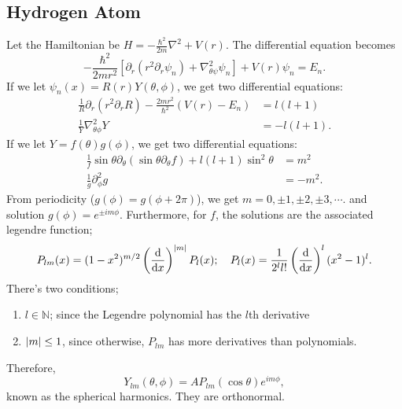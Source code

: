 \documentclass{article}
\begin{document}
\subsection{Hydrogen Atom}
Let the Hamiltonian be $H=-\frac{\hbar^2}{2m}\nabla^2+V(r)$. The differential equation becomes
$$-\frac{\hbar^2}{2mr^2}\left[\partial_r(r^2\partial_r\psi_n)+\nabla_{\theta\psi}^2\psi_n\right]+V(r)\psi_n=E_n.$$
If we let $\psi_n(x)=R(r)Y(\theta,\phi)$, we get two differential equations:
\begin{align*}
    \frac 1R\partial_r(r^2\partial_r R)-\frac{2mr^2}{\hbar^2}(V(r)-E_n)&=l(l+1)\\
    \frac 1Y\nabla^2_{\theta\phi}Y&=-l(l+1).
\end{align*}
If we let $Y=f(\theta)g(\phi)$, we get two differential equations:
\begin{align*}
    \frac 1f\sin\theta\partial_\theta(\sin\theta\partial_\theta f)+l(l+1)\sin^2\theta&=m^2\\
    \frac 1g\partial_\phi^2g&=-m^2.
\end{align*}
From periodicity ($g(\phi)=g(\phi+2\pi)$), we get $m=0,\pm 1,\pm 2,\pm 3,\cdots.$ and solution $g(\phi)=e^{\pm im\phi}$. Furthermore, for $f$, the solutions are the associated legendre function; 
$$P_{lm}(x)=(1-x^2)^{m/2}\left(\frac{\mathrm{d}}{\mathrm{d}x}\right)^{\left\lvert m\right\rvert}P_l(x);\quad P_l(x)=\frac 1{2^ll!}\left(\frac{\mathrm{d}}{\mathrm{d}x}\right)^l(x^2-1)^l.$$
There's two conditions; 
\begin{enumerate}
    \item $l\in\mathbb N$; since the Legendre polynomial has the $l$th derivative
    \item $\left\lvert m\right\rvert\le 1$, since otherwise, $P_{lm}$ has more derivatives than polynomials.
\end{enumerate}
Therefore, 
$$Y_{lm}(\theta,\phi)=AP_{lm}(\cos\theta)e^{im\phi},$$
known as the spherical harmonics. They are orthonormal.
\end{document}
